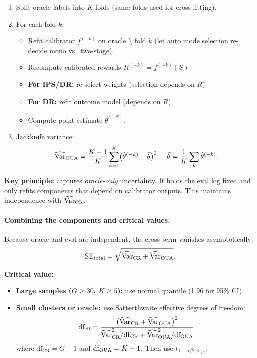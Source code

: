\begin{enumerate}[resume]
\begin{enumerate}
\item Split oracle labels into $K$ folds (same folds used for cross-fitting).
\item For each fold $k$:
\begin{itemize}
\item Refit calibrator $f^{(-k)}$ on oracle $\setminus$ fold $k$ (let auto mode selection re-decide mono vs.\ two-stage).
\item Recompute calibrated rewards $R^{(-k)} = f^{(-k)}(S)$.
\item \textbf{For IPS/DR:} re-select \simcal{} weights (selection depends on $R$).
\item \textbf{For DR:} refit outcome model (depends on $R$).
\item Compute point estimate $\hat{\theta}^{(-k)}$.
\end{itemize}
\item Jackknife variance:
\begin{equation}
\widehat{\operatorname{Var}}_{\text{OUA}} = \frac{K-1}{K} \sum_{k=1}^K \bigl(\hat{\theta}^{(-k)} - \bar{\theta}\bigr)^2, \quad \bar{\theta} = \frac{1}{K}\sum_k \hat{\theta}^{(-k)}.
\end{equation}
\end{enumerate}

\textbf{Key principle:} \oua{} captures \emph{oracle-only} uncertainty. It holds the eval log fixed and only refits components that depend on calibrator outputs. This maintains independence with $\widehat{\operatorname{Var}}_{\text{CR}}$.

\paragraph{Combining the components and critical values.}

Because oracle and eval are independent, the cross-term vanishes asymptotically:
\begin{equation}
\operatorname{SE}_{\text{total}} = \sqrt{\widehat{\operatorname{Var}}_{\text{CR}} + \widehat{\operatorname{Var}}_{\text{OUA}}}.
\end{equation}

\textbf{Critical value:}
\begin{itemize}
\item \textbf{Large samples ($G \ge 30$, $K \ge 5$):} use normal quantile (1.96 for 95\% CI).
\item \textbf{Small clusters or oracle:} use Satterthwaite effective degrees of freedom:
\begin{equation}
\text{df}_{\text{eff}} = \frac{\bigl(\widehat{\operatorname{Var}}_{\text{CR}} + \widehat{\operatorname{Var}}_{\text{OUA}}\bigr)^2}
{\widehat{\operatorname{Var}}_{\text{CR}}^2/\text{df}_{\text{CR}} + \widehat{\operatorname{Var}}_{\text{OUA}}^2/\text{df}_{\text{OUA}}}
\end{equation}
where $\text{df}_{\text{CR}} = G-1$ and $\text{df}_{\text{OUA}} = K-1$. Then use $t_{1-\alpha/2, \text{df}_{\text{eff}}}$.
\end{itemize}


\end{enumerate}

